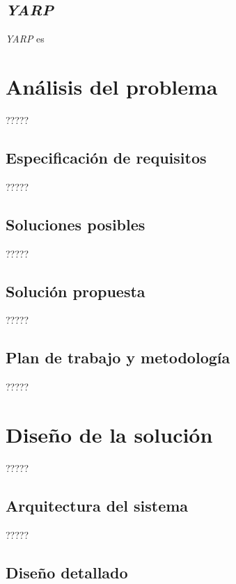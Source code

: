 \documentclass[11pt,spanish,listoffigures]{tfgetsinf}
\begin{document}
\section{\emph{YARP}}
\emph{YARP} \cite{YARP} es


\chapter{Análisis del problema}

?????

\section{Especificación de requisitos}

?????

\section{Soluciones posibles}

?????

\section{Solución propuesta}

?????

\section{Plan de trabajo y metodología}

?????


\chapter{Diseño de la solución}

?????

\section{Arquitectura del sistema}

?????

\section{Diseño detallado}
\end{document}
